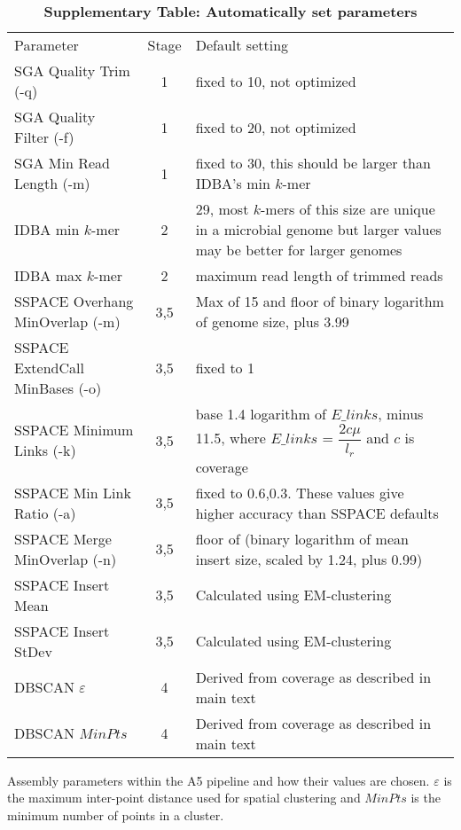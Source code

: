 \documentclass[10pt]{article}
\newcommand\startsupplement{%
    \makeatletter 
       \renewcommand{\thetable}{S\arabic}
    \makeatother}
\begin{document}
\startsupplement

\begin{table}[hp]
\makeatother
\caption{\bf{Supplementary Table: Automatically set parameters}}
\footnotesize
{\begin{tabular}{l|c|l}
Parameter                       & Stage & Default setting  \\
SGA Quality Trim (-q)           & 1     & fixed to 10, not optimized \\
SGA Quality Filter (-f)         & 1     & fixed to 20, not optimized \\
SGA Min Read Length (-m)        & 1     & fixed to 30, this should be larger than IDBA's min $k$-mer \\
IDBA min $k$-mer                & 2     & 29, most $k$-mers of this size are unique in a microbial genome but larger values may be better for larger genomes \\
IDBA max $k$-mer                & 2     & maximum read length of trimmed reads \\
SSPACE Overhang MinOverlap (-m) & 3,5   & Max of 15 and floor of binary logarithm of genome size, plus 3.99  \\
SSPACE ExtendCall MinBases (-o) & 3,5   & fixed to 1 \\
SSPACE Minimum Links (-k)       & 3,5   & base 1.4 logarithm of $E\_links$, minus 11.5, where $E\_links$ = $\dfrac{2c\mu}{l_r}$ and $c$ is coverage \\
SSPACE Min Link Ratio (-a)      & 3,5   & fixed to 0.6,0.3. These values give higher accuracy than SSPACE defaults  \\
SSPACE Merge MinOverlap (-n)    & 3,5   & floor of (binary logarithm of mean insert size, scaled by 1.24, plus 0.99) \\
SSPACE Insert Mean 	        & 3,5   & Calculated using EM-clustering \\
SSPACE Insert StDev             & 3,5   & Calculated using EM-clustering \\
DBSCAN $\varepsilon$            & 4     & Derived from coverage as described in main text \\
DBSCAN $MinPts$                 & 4     & Derived from coverage as described in main text \\
\end{tabular}}
\begin{flushleft} Assembly parameters within the A5 pipeline and how their values are chosen. $\varepsilon$ is the maximum inter-point distance 
used for spatial clustering and $MinPts$ is the minimum number of points in a cluster.
\end{flushleft}
\label{tab:tab03}
\end{table}
\end{document}

